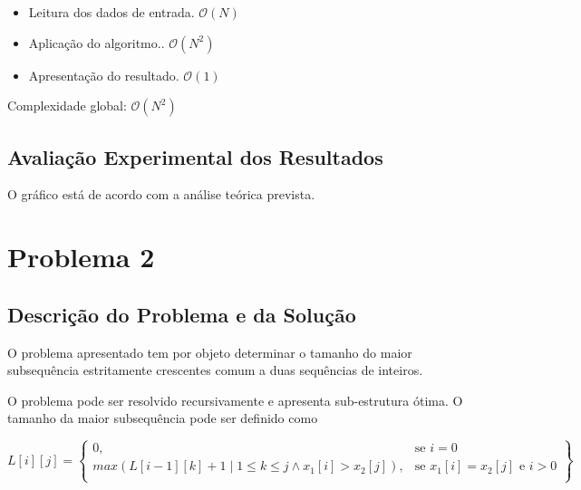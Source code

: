 \documentclass[12pt, letterpaper]{article}
\begin{document}
\begin{itemize}
	\item Leitura dos dados de entrada. $\mathcal{O}(N)$
	\item Aplicação do algoritmo.. $\mathcal{O}(N^2)$
	\item Apresentação do resultado. $\mathcal{O}(1)$
\end{itemize}
Complexidade global: $\mathcal{O}(N^2)$

\subsection{Avaliação Experimental dos Resultados}

\begin{figure}[H]
	\centering

\end{figure}

O gráfico está de acordo com a análise teórica prevista.


\section{Problema 2}
\subsection{Descrição do Problema e da Solução}

O problema apresentado tem por objeto determinar o tamanho do maior subsequência
estritamente crescentes comum a duas sequências de inteiros.

O problema pode ser resolvido recursivamente e apresenta sub-estrutura ótima.
O tamanho da maior subsequência pode ser definido como

\begin{center}
	\[
	L[i][j] = \left\{\begin{array}{lr}
		0, & \text{se } i = 0\\
		max(L[i-1][k] + 1 \mid 1 \leq k \leq j \land x_1[i] > x_2[j]), & \text{se } x_1[i] = x_2[j] \text{ e } i > 0\\
        \end{array}\right\}
	\]\\[\baselineskip]
\end{center}
\end{document}
